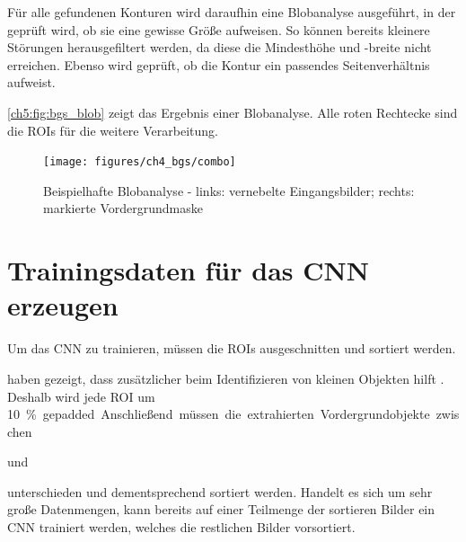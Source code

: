 Für alle gefundenen Konturen wird daraufhin eine Blobanalyse ausgeführt, in der geprüft wird, ob sie eine gewisse Größe aufweisen.
So können bereits kleinere Störungen herausgefiltert werden, da diese die Mindesthöhe und \mbox{-breite} nicht erreichen.
Ebenso wird geprüft, ob die Kontur ein passendes Seitenverhältnis aufweist.

\bigskip
\autoref{ch5:fig:bgs_blob} zeigt das Ergebnis einer Blobanalyse.
Alle roten Rechtecke sind die \acp{ROI} für die weitere Verarbeitung.

\begin{figure}[ht]
    \begin{small}
        \begin{center}
            \texttt{[image: figures/ch4\_bgs/combo]}
        \end{center}
        \caption[Beispielhafte Blobanalyse]{Beispielhafte Blobanalyse - links: vernebelte Eingangsbilder; rechts: markierte Vordergrundmaske}
        \label{ch5:fig:bgs_blob}
    \end{small}
\end{figure}


\section{Trainingsdaten für das CNN erzeugen}
\label{ch5:data}
Um das \ac{CNN} zu trainieren, müssen die \acp{ROI} ausgeschnitten und sortiert werden.

\citeauthor{hu_finding_2016} haben gezeigt, dass zusätzlicher  beim Identifizieren von kleinen Objekten hilft \cite{hu_finding_2016}.
Deshalb wird jede \ac{ROI} um \SI{10}\% gepadded.

Anschließend müssen die extrahierten Vordergrundobjekte zwischen~
\begin{enumerate*}[(\arabic*)]
    \item {} und
    \item {}
\end{enumerate*}
unterschieden und dementsprechend sortiert werden.
Handelt es sich um sehr große Datenmengen, kann bereits auf einer Teilmenge der sortieren Bilder ein \ac{CNN} trainiert werden, welches die restlichen Bilder vorsortiert.


